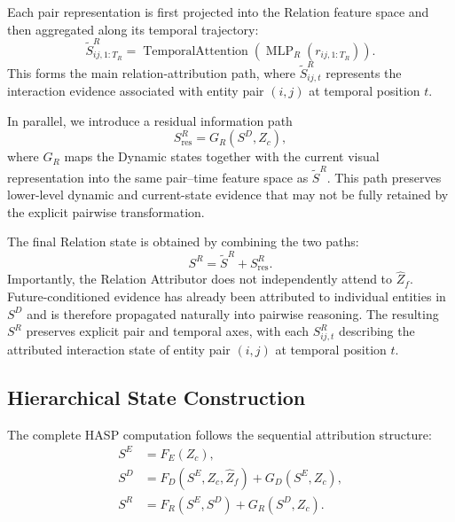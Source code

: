 \documentclass{article}
\begin{document}
Each pair representation is first projected into the Relation feature space and then aggregated along its temporal trajectory:
\begin{equation}
\widetilde S^R_{ij,1:T_R}
=
\operatorname{TemporalAttention}
\left(
\operatorname{MLP}_R
\left(
r_{ij,1:T_R}
\right)
\right).
\label{eq:app-relation-temporal}
\end{equation}
This forms the main relation-attribution path, where $\widetilde S^R_{ij,t}$ represents the interaction evidence associated with entity pair $(i,j)$ at temporal position $t$.

In parallel, we introduce a residual information path
\begin{equation}
S^R_{\mathrm{res}}
=
G_R(S^D,Z_c),
\label{eq:app-relation-residual}
\end{equation}
where $G_R$ maps the Dynamic states together with the current visual representation into the same pair--time feature space as $\widetilde S^R$. This path preserves lower-level dynamic and current-state evidence that may not be fully retained by the explicit pairwise transformation.

The final Relation state is obtained by combining the two paths:
\begin{equation}
S^R
=
\widetilde S^R
+
S^R_{\mathrm{res}}.
\label{eq:app-relation}
\end{equation}
Importantly, the Relation Attributor does not independently attend to $\widehat Z_f$. Future-conditioned evidence has already been attributed to individual entities in $S^D$ and is therefore propagated naturally into pairwise reasoning. The resulting $S^R$ preserves explicit pair and temporal axes, with each $S^R_{ij,t}$ describing the attributed interaction state of entity pair $(i,j)$ at temporal position $t$.

\subsection{Hierarchical State Construction}
\label{app:hierarchical-state}

The complete HASP computation follows the sequential attribution structure:
\begin{align}
    S^E
    &= F_E(Z_c), \\
    S^D
    &= F_D(S^E,Z_c,\widehat Z_f)
    + G_D(S^E,Z_c), \\
    S^R
    &= F_R(S^E,S^D)
    + G_R(S^D,Z_c).
    \label{eq:app-hasp}
\end{align}
\end{document}
